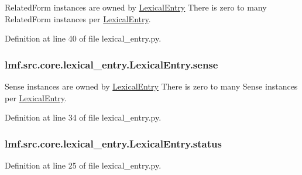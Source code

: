 Related\+Form instances are owned by \hyperlink{classlmf_1_1src_1_1core_1_1lexical__entry_1_1_lexical_entry}{Lexical\+Entry} There is zero to many Related\+Form instances per \hyperlink{classlmf_1_1src_1_1core_1_1lexical__entry_1_1_lexical_entry}{Lexical\+Entry}. 



Definition at line 40 of file lexical\+\_\+entry.\+py.

\hypertarget{classlmf_1_1src_1_1core_1_1lexical__entry_1_1_lexical_entry_a92b1d39e09a8af1a90e780ef5780cc92}{
\subsubsection[{sense}]{\setlength{\rightskip}{0pt plus 5cm}lmf.\+src.\+core.\+lexical\+\_\+entry.\+Lexical\+Entry.\+sense}}\label{classlmf_1_1src_1_1core_1_1lexical__entry_1_1_lexical_entry_a92b1d39e09a8af1a90e780ef5780cc92}


Sense instances are owned by \hyperlink{classlmf_1_1src_1_1core_1_1lexical__entry_1_1_lexical_entry}{Lexical\+Entry} There is zero to many Sense instances per \hyperlink{classlmf_1_1src_1_1core_1_1lexical__entry_1_1_lexical_entry}{Lexical\+Entry}. 



Definition at line 34 of file lexical\+\_\+entry.\+py.

\hypertarget{classlmf_1_1src_1_1core_1_1lexical__entry_1_1_lexical_entry_aaec5fa141d51ae38a0346b0f863f4522}{
\subsubsection[{status}]{\setlength{\rightskip}{0pt plus 5cm}lmf.\+src.\+core.\+lexical\+\_\+entry.\+Lexical\+Entry.\+status}}\label{classlmf_1_1src_1_1core_1_1lexical__entry_1_1_lexical_entry_aaec5fa141d51ae38a0346b0f863f4522}


Definition at line 25 of file lexical\+\_\+entry.\+py.

